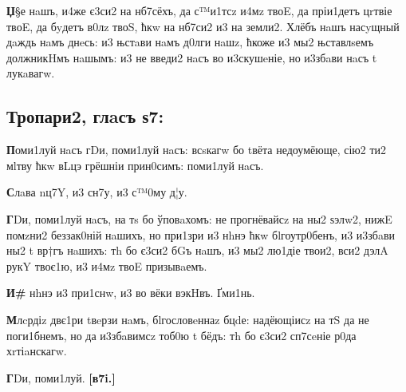 \textbf{Џ}§е нaшъ, и4же є3си2 на нб7сёхъ, да с™и1тсz и4мz твоE, да пріи1детъ
цrтвіе твоE, да бyдетъ в0лz твоS, ћкw на нб7си2 и3 на земли2. Хлёбъ нaшъ
насyщный дaждь нaмъ днeсь: и3 њстaви нaмъ д0лги нaшz, ћкоже и3 мы2
њставлsемъ должникHмъ нaшымъ: и3 не введи2 нaсъ во и3скушeніе, но
и3збaви нaсъ t лукaвагw.

\subsection{Тропари2, глaсъ
    ѕ7:}

\textbf{П}оми1луй нaсъ гDи, поми1луй нaсъ: всsкагw бо tвёта недоумёюще, сію2 ти2
мlтву ћкw вLцэ грёшніи прин0симъ: поми1луй нaсъ.

\textbf{С}лaва nц7Y, и3 сн7у, и3 с™0му д¦у.

\textbf{Г}Dи, поми1луй нaсъ, на тs бо ўповaхомъ: не прогнёвайсz на ны2 ѕэлw2,
нижE помzни2 беззак0ній нaшихъ, но при1зри и3 нhнэ ћкw бlгоутр0бенъ, и3
и3збaви ны2 t вр†гъ нaшихъ: тh бо є3си2 бGъ нaшъ, и3 мы2 лю1діе твои2,
вси2 дэлA рукY твоє1ю, и3 и4мz твоE призывaемъ.

\textbf{И\#} нhнэ и3 при1снw, и3 во вёки вэкHвъ. Ґми1нь.

\textbf{М}лcрдіz двє1ри tвeрзи нaмъ, бlгословeннаz бцdе: надёющіисz на тS да не
поги1бнемъ, но да и3збaвимсz тоб0ю t бёдъ: тh бо є3си2 сп7сeніе р0да
хrтіaнскагw.

\textbf{Г}Dи, поми1луй. \textbf{{[}в7i.{]}}

